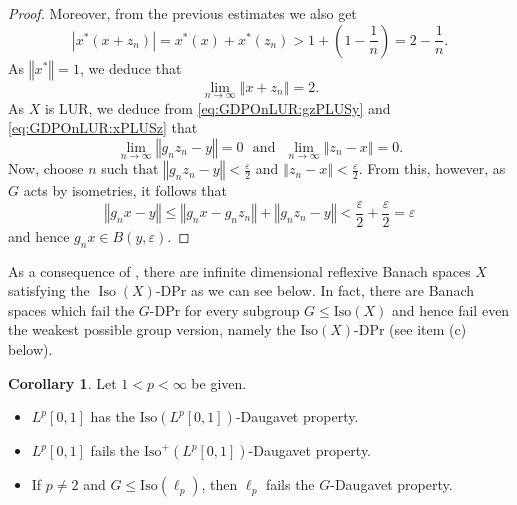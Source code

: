 \documentclass[a4paper,12pt]{amsart}
\theoremstyle{definition}
\newtheorem{corollary}[theorem]{Corollary}
\theoremstyle{definition}
\theoremstyle{remark}
\numberwithin{equation}{section}
\newcommand{\Iso}{\mathrm{Iso}}
\DeclareMathOperator{\iso}{Iso}
\renewcommand{\leq}{\leqslant}
\newcommand{\<}{\langle}
\renewcommand{\>}{\rangle}
\newcommand{\norm}[1]{\left\Vert#1\right\Vert}
\newcommand{\abs}[1]{\left\vert#1\right\vert}
\newcommand{\e}{\varepsilon}
\newcommand{\eps}{\e}
\begin{document}
\begin{proof}
		Moreover, from the previous estimates we also get
		\begin{equation*}
			\abs{x^*(x+z_n)}
			= x^*(x) + x^*(z_n)
			> 1 + \left(1 - \frac{1}{n}\right)
			= 2 - \frac{1}{n}.
		\end{equation*}
		As $\norm{x^*} = 1$, we deduce that
		\begin{equation} \label{eq:GDPOnLUR:xPLUSz}
			\lim_{n \to \infty}\norm{x + z_n} = 2.
		\end{equation}
		As $X$ is LUR, we deduce from \eqref{eq:GDPOnLUR:gzPLUSy} and \eqref{eq:GDPOnLUR:xPLUSz} that
		\begin{equation*}
			\lim_{n \to \infty}\norm{g_n z_n - y} = 0
			\ \ \ \text{and} \ \ \ 
			\lim_{n \to \infty}\norm{z_n - x} = 0.
		\end{equation*}
		Now, choose $n$ such that $\norm{g_n z_n - y} < \frac{\eps}{2}$ and $\norm{z_n - x} < \frac{\eps}{2}$.
		From this, however, as $G$ acts by isometries, it follows that
		\begin{equation*}
			\norm{g_n x - y}
			\leq \norm{g_n x - g_n z_n} + \norm{g_n z_n - y}
			< \frac{\eps}{2} + \frac{\eps}{2}
			= \eps
		\end{equation*}
		and hence $g_n x \in B(y, \eps)$.
	\end{proof}
	
	
	As a consequence of , there are infinite dimensional reflexive Banach spaces $X$ satisfying the $\iso(X)$-DPr as we can see below. In fact, there are Banach spaces which fail the $G$-DPr for every subgroup $G\leq \Iso(X)$ and hence fail even the weakest possible group version, namely the $\Iso(X)$-DPr (see item (c) below).
	
	
	\begin{corollary} \label{cor:Lp-ellp-examples}
		Let $1<p<\infty$ be given.
		\begin{itemize}
			\item[(a)] $L^p[0,1]$ has the $\Iso(L^p[0,1])$-Daugavet property.
			
			\item[(b)]  $L^p[0,1]$ fails the $\Iso^+(L^p[0,1])$-Daugavet property.
			
			\item[(c)] If $p\not=2$ and $G\leq \Iso(\ell_p)$, then \(\ell_p\) fails the $G$-Daugavet property.
		\end{itemize}
	\end{corollary}
	
\end{document}
